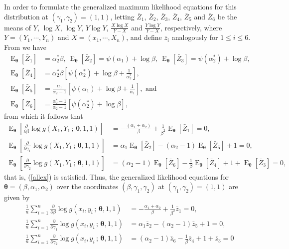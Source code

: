 \documentclass[lineno]{biometrika}
\newcommand{\bs}{\boldsymbol}
\newcommand{\on}{\operatorname}
\begin{document}
In order to formulate the generalized maximum likelihood equations for this distribution at $(\gamma_1,\gamma_2)=(1,1)$, letting $\bar{Z}_1$, $\bar{Z}_2$, $\bar{Z}_3$, $\bar{Z}_4$, $\bar{Z}_5$ and $\bar{Z}_6$ be the means of $Y$, $\log X$, $\log Y$, $Y\log Y$, $\frac{X \log X}{Y-X}$ and $\frac{Y \log Y}{Y-X}$, respectively, where $Y=(Y_1,\cdots,Y_n)$ and $X=(x_1,\cdots,X_n)$, and define $\bar{z}_i$ analogously for $1\leq i\leq 6$. From \cite{2022-Zhao} we have
\begin{equation}\label{relations3}
\begin{aligned}
\on{E}_{\bs{\theta}}\left[\bar{Z}_1\right] &= \alpha_2^*\beta,\ 
\on{E}_{\bs{\theta}}\left[\bar{Z}_2\right] = \psi(\alpha_1) + \log \beta,\ \on{E}_{\bs{\theta}}\left[\bar{Z}_3\right] = \psi(\alpha_2^*) + \log \beta,\\ 
\on{E}_{\bs{\theta}}\left[\bar{Z}_4\right] &= \alpha_2^*\beta \left[\psi(\alpha_2^*) + \log \beta + \frac{1}{\alpha_2^*}\right],\\
\on{E}_{\bs{\theta}}\left[\bar{Z}_5\right] &= \frac{\alpha_1}{\alpha_2 - 1}\left[\psi(\alpha_1) + \log \beta + \frac{1}{\alpha_1}\right],\mbox{ and}\\
\on{E}_{\bs{\theta}}\left[\bar{Z}_6\right] &= \frac{\alpha_2^*-1}{\alpha_2 - 1}\left[\psi(\alpha_2^*) + \log \beta\right],
\end{aligned}
\end{equation}
from which it follows that
\begin{align*}
\on{E}_{\bs{\theta}} \left[\frac{\partial}{\partial \beta}  \log g(X_1,Y_1\,;\,\bs{\theta},1,1)\right] &= -\frac{(\alpha_1 + \alpha_2)}{\beta} + \frac{1}{\beta^2} \on{E}_{\bs{\theta}}[\bar{Z}_1] = 0, \\
\on{E}_{\bs{\theta}} \left[\frac{\partial}{\partial \gamma_1}  \log g(X_1,Y_1\,;\,\bs{\theta},1,1)\right] &= \alpha_1 \on{E}_{\bs{\theta}}[ \bar{Z}_2] - (\alpha_2 - 1) \on{E}_{\bs{\theta}}\left[\bar{Z}_5\right] + 1 = 0, \\
\on{E}_{\bs{\theta}} \left[\frac{\partial}{\partial \gamma_2}  \log g(X_1,Y_1\,;\,\bs{\theta},1,1)\right] &= (\alpha_2 - 1) \on{E}_{\bs{\theta}}\left[\bar{Z}_6\right] - \frac{1}{\beta} \on{E}_{\bs{\theta}}\left[\bar{Z}_4\right] + 1 + \on{E}_{\bs{\theta}}\left[\bar{Z}_3\right]=0,
\end{align*}
that is, (\ref{allex}) is satisfied. Thus, the generalized likelihood equations for $\bs{\theta}=(\beta,\alpha_1,\alpha_2)$ over the coordinates $(\beta, \gamma_1,\gamma_2)$ at $(\gamma_1,\gamma_2)=(1,1)$ are given by
\begin{align*}
\frac{1}{n}\sum_{i=1}^n\frac{\partial}{\partial \beta}  \log g(x_i,y_i\,;\,\bs{\theta},1,1) &= -\frac{\alpha_1 + \alpha_2}{\beta} + \frac{1}{\beta^2} \bar{z}_1 = 0, \\
\frac{1}{n}\sum_{i=1}^n\frac{\partial}{\partial \gamma_1}  \log g(x_i,y_i\,;\,\bs{\theta},1,1) &= \alpha_1 \bar{z}_2 - (\alpha_2 - 1) \bar{z}_5 + 1 = 0, \\
\frac{1}{n}\sum_{i=1}^n \frac{\partial}{\partial \gamma_2}  \log g(x_i,y_i\,;\,\bs{\theta},1,1) &= (\alpha_2 - 1) \bar{z}_6 - \frac{1}{\beta}\bar{z}_4 + 1 + \bar{z}_3 = 0
\end{align*}
\end{document}
